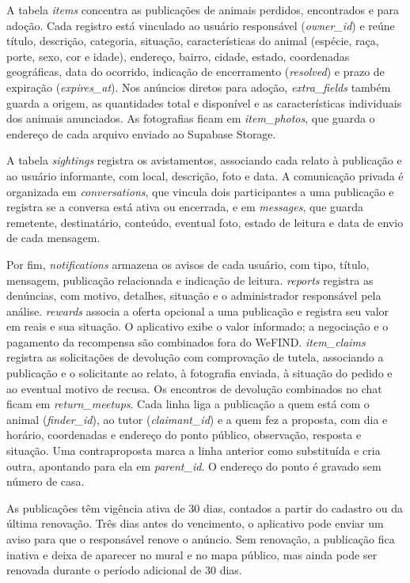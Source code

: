 A tabela \textit{items} concentra as publicações de animais perdidos, encontrados e para adoção. Cada registro está vinculado ao usuário responsável (\textit{owner\_id}) e reúne título, descrição, categoria, situação, características do animal (espécie, raça, porte, sexo, cor e idade), endereço, bairro, cidade, estado, coordenadas geográficas, data do ocorrido, indicação de encerramento (\textit{resolved}) e prazo de expiração (\textit{expires\_at}). Nos anúncios diretos para adoção, \textit{extra\_fields} também guarda a origem, as quantidades total e disponível e as características individuais dos animais anunciados. As fotografias ficam em \textit{item\_photos}, que guarda o endereço de cada arquivo enviado ao Supabase Storage.

A tabela \textit{sightings} registra os avistamentos, associando cada relato à publicação e ao usuário informante, com local, descrição, foto e data. A comunicação privada é organizada em \textit{conversations}, que vincula dois participantes a uma publicação e registra se a conversa está ativa ou encerrada, e em \textit{messages}, que guarda remetente, destinatário, conteúdo, eventual foto, estado de leitura e data de envio de cada mensagem.

Por fim, \textit{notifications} armazena os avisos de cada usuário, com tipo, título, mensagem, publicação relacionada e indicação de leitura. \textit{reports} registra as denúncias, com motivo, detalhes, situação e o administrador responsável pela análise. \textit{rewards} associa a oferta opcional a uma publicação e registra seu valor em reais e sua situação. O aplicativo exibe o valor informado; a negociação e o pagamento da recompensa são combinados fora do WeFIND. \textit{item\_claims} registra as solicitações de devolução com comprovação de tutela, associando a publicação e o solicitante ao relato, à fotografia enviada, à situação do pedido e ao eventual motivo de recusa. Os encontros de devolução combinados no chat ficam em \textit{return\_meetups}. Cada linha liga a publicação a quem está com o animal (\textit{finder\_id}), ao tutor (\textit{claimant\_id}) e a quem fez a proposta, com dia e horário, coordenadas e endereço do ponto público, observação, resposta e situação. Uma contraproposta marca a linha anterior como substituída e cria outra, apontando para ela em \textit{parent\_id}. O endereço do ponto é gravado sem número de casa.

As publicações têm vigência ativa de 30 dias, contados a partir do cadastro ou da última renovação. Três dias antes do vencimento, o aplicativo pode enviar um aviso para que o responsável renove o anúncio. Sem renovação, a publicação fica inativa e deixa de aparecer no mural e no mapa público, mas ainda pode ser renovada durante o período adicional de 30 dias.


